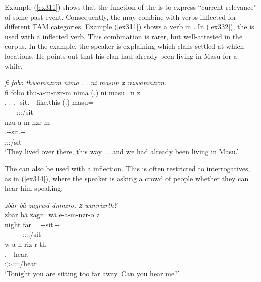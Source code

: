Example (\ref{ex311}) shows that the function of the  is to express ``current relevance'' of some past event. Consequently, the  may combine with verbs inflected for different TAM categories. Example (\ref{ex311}) shows a verb in  . In (\ref{ex332}), the   is used with a   inflected verb. This combination is rarer, but well-attested in the corpus. In the example, the speaker is explaining which clans settled at which locations. He points out that his clan had already been living in Masu for a while.

\begin{exe}
	\ex \emph{fi fobo thwamnzrm nima ... ni masun \textbf{z} nzwamnzrm.}\\
	\glll fi fobo thu-a-m-nzr-m nima (.) ni masu=n z\\
	\Third.{\Abs} \Dist.{\All} \Stnsg.\Betaone-\Vc-sit.\Ext-\Ndu-\Dur{} like.this (.) {\Fnsg} masu={\Loc} {\Iam}\\
	~ ~ {\footnotesize \Stpl:\Sbj:\Pst:\Dur/sit} ~ ~ ~ ~ ~\\
	\sn
	\glll nzu-a-m-nzr-m\\
	\Fnsg.\Betaone-\Vc-sit.\Ext-\Ndu-\Dur{}\\
	{\footnotesize \Fpl:\Sbj:\Pst:\Dur/sit}\\
	\trans `They lived over there, this way ... and we had already been living in Masu.'\\ 
	\label{ex332}
\end{exe}

The   can also be used with a  inflection. This is often restricted to interrogatives, as in (\ref{ex314}), where the speaker is asking a crowd of people whether they can hear him speaking.

\begin{exe}
	\ex \emph{zbär bä zagrwä ämnzro. \textbf{z} wanrizrth?}\\
	\glll zbär bä zagr=wä e-a-m-nzr-o z\\
	night \Med{} far={\Emph} \Stnsg.\Alph-\Vc-sit.\Ext-\Ndu-\Andat{} {\Iam}\\
	~ ~ ~ {\footnotesize \Stpl:\Sbj:\Nonpast:\Ipfv:\Andat/sit} ~\\
	\sn
	\glll w-a-n-riz-r-th\\
	\Fsg.\Alph-\Vc-\Venit-hear.\Ext-\Ndu-\Stnsg{}\\
	{\footnotesize \Stpl:\Sbj>\Fsg:\Io:\Nonpast:\Ipfv:\Venit/hear}\\
	\trans `Tonight you are sitting too far away. Can you hear me?' 
	\label{ex314}
\end{exe}

